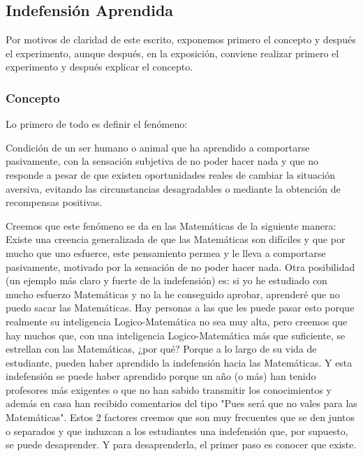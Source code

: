 \subsection{Indefensión Aprendida}
\label{defn::indefension}

Por motivos de claridad de este escrito, exponemos primero el concepto y después el experimento, aunque después, en la exposición, conviene realizar primero el experimento y después explicar el concepto.

\subsubsection{Concepto}

Lo primero de todo es definir el fenómeno:

\begin{defn}
Condición de un ser humano o animal que ha aprendido a comportarse pasivamente, con la sensación subjetiva de no poder hacer nada y que no responde a pesar de que existen oportunidades reales de cambiar la situación aversiva, evitando las circunstancias desagradables o mediante la obtención de recompensas positivas.
\end{defn}

Creemos que este fenómeno se da en las Matemáticas de la siguiente manera:
%
Existe una creencia generalizada de que las Matemáticas son difíciles y que por mucho que uno esfuerce, este pensamiento permea y le lleva a comportarse pasivamente, motivado por la sensación de no poder hacer nada.
%
Otra posibilidad (un ejemplo más claro y fuerte de la indefensión) es: si yo he estudiado con mucho esfuerzo Matemáticas y no la he conseguido aprobar, aprenderé que no puedo sacar las Matemáticas.
%
Hay personas a las que les puede pasar esto porque realmente su inteligencia Logico-Matemática no sea muy alta, pero creemos que hay muchos que, con una inteligencia Logico-Matemática más que suficiente, se estrellan con las Matemáticas, ¿por qué? 
%
Porque a lo largo de su vida de estudiante, pueden haber aprendido la indefensión hacia las Matemáticas. 
%
Y esta indefensión se puede haber aprendido porque un año (o más) han tenido profesores más exigentes o que no han sabido transmitir los conocimientos y además en casa han recibido comentarios del tipo "Pues será que no vales para las Matemáticas".
%
Estos 2 factores creemos que son muy frecuentes que se den juntos o separados y que induzcan a los estudiantes una indefensión que, por supuesto, se puede desaprender. Y para desaprenderla, el primer paso es conocer que existe.


